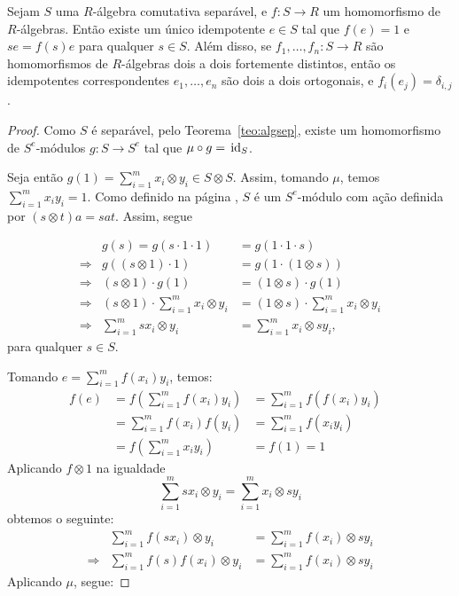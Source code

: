 \begin{lemma} \label{lem:fdist}
Sejam $S$ uma $R$-álgebra comutativa separável, e $f:S\rightarrow R$ um homomorfismo de $R$-álgebras. Então existe um único idempotente $e\in S$ tal que $f(e)=1$ e $se=f(s)e$ para qualquer $s\in S$. Além disso, se $f_1,\dots,f_n:S\rightarrow R$ são homomorfismos de $R$-álgebras dois a dois fortemente distintos, então os idempotentes correspondentes $e_1, \dots, e_n$ são dois a dois ortogonais, e $f_i(e_j)=\delta_{i,j}$.
\begin{proof}
Como $S$ é separável, pelo Teorema~\ref{teo:algsep}, existe um homomorfismo de $S^e$-módulos $g:S\rightarrow S^e$ tal que $\mu\circ g = \, \textrm{id}_{S}$.
\begin{center}
\end{center}
Seja então $g(1)=\sum_{i=1}^{m}x_i\otimes y_i \in S\otimes S$. Assim, tomando $\mu$, temos $\sum_{i=1}^{m}x_iy_i=1$. Como definido na página \pageref{def:algenv}, $S$ é um $S^e$-módulo com ação definida por $(s\otimes t)a = sat$. Assim, segue

\[\begin{array}{rrl}
     & g(s) = g(s\cdot 1 \cdot 1)  &= g(1\cdot 1 \cdot s) \\
     \Rightarrow & g\left((s\otimes 1) \cdot 1\right) &= g\left(1\cdot (1\otimes s)\right) \\
    \Rightarrow & (s\otimes 1) \cdot g(1) &= (1\otimes s) \cdot g(1) \\
    \Rightarrow & (s\otimes 1) \cdot \sum_{i=1}^{m}x_i\otimes y_i &= (1\otimes s) \cdot \sum_{i=1}^{m}x_i\otimes y_i \\
    \Rightarrow & \sum_{i=1}^{m}sx_i\otimes y_i & = \sum_{i=1}^{m}x_i\otimes sy_i,
\end{array}\]
para qualquer $s \in S$. \par
Tomando $e=\sum_{i=1}^m f(x_i)y_i$, temos:
\[\begin{array}{rlll}
    f(e) &= f\left(\sum_{i=1}^m f(x_i)y_i\right) &= \sum_{i=1}^m f\left(f(x_i)y_i\right) & \\
     &= \sum_{i=1}^m f(x_i)f(y_i) &= \sum_{i=1}^m f(x_iy_i) & \\
     &= f\left(\sum_{i=1}^m x_iy_i\right) &= f(1) = 1
\end{array}\]
Aplicando $f\otimes 1$ na igualdade\[\sum_{i=1}^{m}sx_i\otimes y_i = \sum_{i=1}^{m}x_i\otimes sy_i\]obtemos o seguinte:
\[\begin{array}{rrl}
    & \sum_{i=1}^{m}f(sx_i)\otimes y_i &= \sum_{i=1}^{m}f(x_i)\otimes sy_i \\
    \Rightarrow & \sum_{i=1}^{m}f(s)f(x_i)\otimes y_i &= \sum_{i=1}^{m} f(x_i) \otimes sy_i
\end{array}\]
Aplicando $\mu$, segue:


\end{proof}
\end{lemma}
